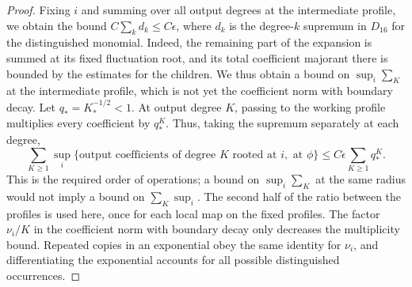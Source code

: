 \begin{proof}
Fixing $i$ and summing over all output degrees at the intermediate profile, we obtain the bound $C\sum_kd_k\le C\epsilon$, where $d_k$ is the degree-$k$ supremum in $D_{16}$ for the distinguished monomial. Indeed, the remaining part of the expansion is summed at its fixed fluctuation root, and its total coefficient majorant there is bounded by the estimates for the children. We thus obtain a bound on $\sup_i\sum_K$ at the intermediate profile, which is not yet the coefficient norm with boundary decay. Let $q_*=K_*^{-1/2}<1$. At output degree $K$, passing to the working profile multiplies every coefficient by $q_*^K$. Thus, taking the supremum separately at each degree,
\[
 \sum_{K\ge1}\sup_i\bigl\{\text{output coefficients of degree }K\text{ rooted at }i,\text{ at }\phi\bigr\}\le C\epsilon\sum_{K\ge1}q_*^K.
\]
This is the required order of operations; a bound on $\sup_i\sum_K$ at the same radius would not imply a bound on $\sum_K\sup_i$. The second half of the ratio between the profiles is used here, once for each local map on the fixed profiles. The factor $\nu_i/K$ in the coefficient norm with boundary decay only decreases the multiplicity bound. Repeated copies in an exponential obey the same identity for $\nu_i$, and differentiating the exponential accounts for all possible distinguished occurrences.


\end{proof}

